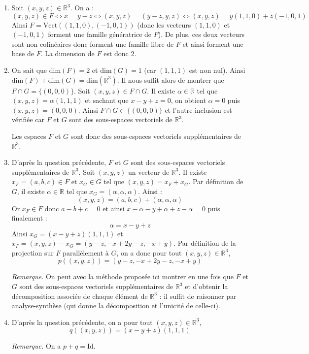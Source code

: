 \documentclass[a4paper,10pt]{report}
\begin{document}
\begin{enumerate}
\item Soit $(x,y,z) \in \mathbb{R}^3$. On a :
$$ (x,y,z) \in F \Longleftrightarrow x=y-z \Longleftrightarrow (x,y,z) = (y-z,y,z) \Longleftrightarrow (x,y,z) = y(1,1,0) + z(-1,0,1)$$
Ainsi $F = \textrm{Vect}((1,1,0), (-1,0,1))$ (donc les vecteurs $(1,1,0)$ et $(-1,0,1)$ forment une famille génératrice de $F$). De plus, ces deux vecteurs sont non colinéaires donc forment une famille libre de $F$ et ainsi forment une base de $F$. La dimension de $F$ est donc $2$.
\item On sait que $\textrm{dim}(F)=2$ et $\textrm{dim}(G)=1$ (car $(1,1,1)$ est non nul). Ainsi $\textrm{dim}(F) + \textrm{dim}(G) = \textrm{dim}(\mathbb{R}^3)$. Il nous suffit alors de montrer que $F \cap G = \lbrace (0,0,0) \rbrace$. Soit $(x,y,z) \in F \cap G$. Il existe $\alpha \in \mathbb{R}$ tel que $(x,y,z) = \alpha (1,1,1)$ et sachant que $x-y+z=0$, on obtient $\alpha = 0$ puis $(x,y,z)=(0,0,0)$. Ainsi $F \cap G \subset \lbrace (0,0,0) \rbrace$ et l'autre inclusion est vérifiée car $F$ et $G$ sont des sous-espaces vectoriels de $\mathbb{R}^3$.

\medskip

\noindent Les espaces $F$ et $G$ sont donc des sous-espaces vectoriels supplémentaires de $\mathbb{R}^3$.
\item D'après la question précédente, $F$ et $G$ sont  des sous-espaces vectoriels supplémentaires de $\mathbb{R}^3$. Soit $(x,y,z)$ un vecteur de $\mathbb{R}^3$. Il existe $x_F = (a,b,c) \in F$ et $x_G \in G$ tel que $(x,y,z) = x_F + x_G$. Par définition de $G$, il existe $\alpha \in \mathbb{R}$ tel que $x_G = (\alpha, \alpha, \alpha)$. Ainsi :
$$ (x,y,z) = (a,b,c) + (\alpha, \alpha, \alpha)$$
Or $x_F \in F$ donc $a-b+c=0$ et ainsi $x- \alpha- y + \alpha + z - \alpha = 0$ puis finalement :
$$ \alpha = x-y+z $$
Ainsi $x_G = (x-y+z) (1,1,1)$ et $x_F = (x,y,z) - x_G = (y-z, -x+2y-z,-x+y)$. Par définition de la projection sur $F$ parallèlement à $G$, on a donc pour tout $(x,y,z) \in \mathbb{R}^3$,
$$ p((x,y,z)) = (y-z, -x+2y-z,-x+y)$$

\medskip

\noindent \textit{Remarque.} On peut avec la méthode proposée ici montrer en une fois que $F$ et $G$ sont des sous-espaces vectoriels supplémentaires de $\mathbb{R}^3$ et d'obtenir la décomposition associée de chaque élément de $\mathbb{R}^3$ : il suffit de raisonner par analyse-synthèse (qui donne la décomposition et l'unicité de celle-ci).
\item D'après la question précédente, on a pour tout $(x,y,z) \in \mathbb{R}^3$, 
$$ q((x,y,z)) = (x-y+z) (1,1,1)$$

\medskip

\noindent \textit{Remarque.} On a $p+q=\textrm{Id}$.
\end{enumerate}
\end{document}

